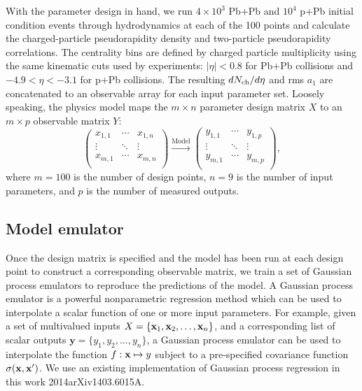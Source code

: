 With the parameter design in hand, we run $4\times 10^3$ Pb+Pb and $10^4$ p+Pb initial condition events through hydrodynamics at each of the 100 points and calculate the charged-particle pseudorapidity density and two-particle pseudorapidity correlations.
The centrality bins are defined by charged particle multiplicity using the same kinematic cuts used by experiments: $|\eta|<0.8$ for Pb+Pb collisions and ${-4.9 < \eta < -3.1}$ for p+Pb collisions.
The resulting $dN_\text{ch}/d\eta$ and rms $a_1$ are concatenated to an observable array for each input parameter set.
Loosely speaking, the physics model maps the $m\times n$ parameter design matrix $X$ to an $m \times p$ observable matrix $Y$:
\begin{equation}
  \begin{pmatrix}
    x_{1,1} & \cdots & x_{1,n} \\
    \vdots  & \ddots & \vdots \\
    x_{m,1} & \cdots & x_{m,n} \\
  \end{pmatrix}
  \xrightarrow{\text{Model}}
  \begin{pmatrix}
    y_{1,1} & \cdots & y_{1,p} \\
    \vdots  & \ddots & \vdots \\
    y_{m,1} & \cdots & y_{m,p} \\
  \end{pmatrix},
  \label{design-obs}
\end{equation}
where $m=100$ is the number of design points, ${n=9}$ is the number of input parameters, and $p$ is the number of measured outputs.

\subsection{Model emulator}

Once the design matrix is specified and the model has been run at each design point to construct a corresponding observable matrix, we train a set of Gaussian process emulators to reproduce the predictions of the model.
A Gaussian process emulator is a powerful nonparametric regression method which can be used to interpolate a scalar function of one or more input parameters.
For example, given a set of multivalued inputs ${X=\{\mathbf x_1, \mathbf x_2, \ldots, \mathbf x_n\}}$, and a corresponding list of scalar outputs $\mathbf y=\{y_1, y_2, \ldots, y_n \}$, a Gaussian process emulator can be used to interpolate the function $f: \mathbf x \mapsto y$ subject to a pre-specified covariance function $\sigma(\mathbf x,\mathbf x')$.
We use an existing implementation of Gaussian process regression in this work {2014arXiv1403.6015A}.

